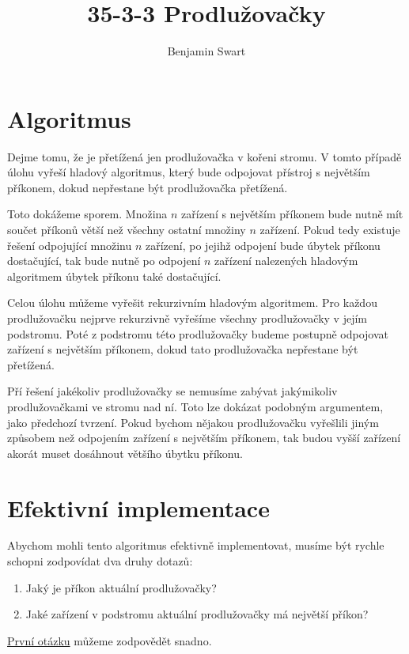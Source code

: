 \documentclass{article}
\title{35-3-3 Prodlužovačky}
\author{Benjamin Swart}
\begin{document}
\maketitle

\section{Algoritmus}

Dejme tomu, že je přetížená jen prodlužovačka v kořeni stromu. V tomto případě úlohu vyřeší hladový algoritmus, který bude odpojovat přístroj s největším příkonem, dokud nepřestane být prodlužovačka přetížená.

Toto dokážeme sporem. Množina $n$ zařízení s největším příkonem bude nutně mít součet příkonů větší než všechny ostatní množiny $n$ zařízení. Pokud tedy existuje řešení odpojující množinu $n$ zařízení, po jejihž odpojení bude úbytek příkonu dostačující, tak bude nutně po odpojení $n$ zařízení nalezených hladovým algoritmem úbytek příkonu také dostačující.

Celou úlohu můžeme vyřešit rekurzivním hladovým algoritmem. Pro každou prodlužovačku nejprve rekurzivně vyřešíme všechny prodlužovačky v jejím podstromu. Poté z podstromu této prodlužovačky budeme postupně odpojovat zařízení s největším příkonem, dokud tato prodlužovačka nepřestane být přetížená.

Pří řešení jakékoliv prodlužovačky se nemusíme zabývat jakýmikoliv prodlužovačkami ve stromu nad ní. Toto lze dokázat podobným argumentem, jako předchozí tvrzení. Pokud bychom nějakou prodlužovačku vyřešlili jiným způsobem než odpojením zařízení s největším příkonem, tak budou vyšší zařízení akorát muset dosáhnout většího úbytku příkonu.

\section{Efektivní implementace}

Abychom mohli tento algoritmus efektivně implementovat, musíme být rychle schopni zodpovídat dva druhy dotazů:

\begin{enumerate}
        \item \label{question:load} Jaký je příkon aktuální prodlužovačky?
        \item \label{question:max} Jaké zařízení v podstromu aktuální prodlužovačky má největší příkon?
\end{enumerate}

\hyperref[question:load]{První otázku} můžeme zodpovědět snadno.
\end{document}
